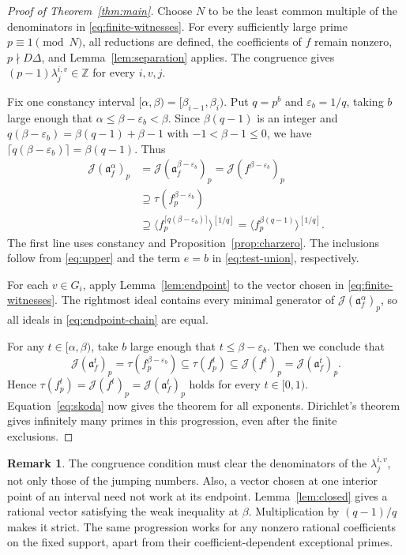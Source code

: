 \documentclass[11pt]{amsart}
\numberwithin{equation}{section}
\theoremstyle{definition}
\newtheorem{remark}[theorem]{Remark}
\newcommand{\J}{\mathcal J}
\newcommand{\aideal}{\mathfrak a}
\newcommand{\Z}{\mathbb Z}
\begin{document}
\begin{proof}[Proof of Theorem~\ref{thm:main}]
Choose $N$ to be the least common multiple of the denominators in
\eqref{eq:finite-witnesses}. For every sufficiently large prime
$p\equiv1\pmod N$, all reductions are defined, the coefficients of $f$
remain nonzero, $p\nmid D\Delta$, and Lemma~\ref{lem:separation} applies. The congruence
gives $(p-1)\lambda_j^{i,v}\in\Z$ for every $i,v,j$.

Fix one constancy interval $[\alpha,\beta)=[\beta_{i-1},\beta_i)$.
Put $q=p^b$ and $\varepsilon_b=1/q$, taking $b$ large enough that
$\alpha\le \beta -\varepsilon_b <\beta$. Since $\beta(q-1)$ is an integer and
$q(\beta -\varepsilon_b)=\beta(q-1)+\beta-1$ with $-1<\beta-1\le0$, we have
$\lceil q (\beta -\varepsilon_b)\rceil=\beta(q-1)$. Thus
\begin{equation}\label{eq:endpoint-chain}
\begin{aligned}
 \J(\aideal_f^\alpha)_p
 &=\J(\aideal_f^{\beta -\varepsilon_b})_p=\J(f^{\beta -\varepsilon_b})_p\\
 &\supseteq\tau(f_p^{\beta -\varepsilon_b})\\
 &\supseteq\langle f_p^{\lceil q(\beta -\varepsilon_b)\rceil}\rangle^{[1/q]}
 =\langle f_p^{\beta(q-1)}\rangle^{[1/q]}.
\end{aligned}
\end{equation}
The first line uses constancy and Proposition~\ref{prop:charzero}.
The inclusions follow from \eqref{eq:upper} and the term $e=b$ in
\eqref{eq:test-union}, respectively.

For each $v\in G_i$, apply Lemma~\ref{lem:endpoint} to the vector
chosen in \eqref{eq:finite-witnesses}. The rightmost ideal contains
every minimal generator of $\J(\aideal_f^\alpha)_p$, so all ideals
in \eqref{eq:endpoint-chain} are equal.

For any $t\in[\alpha,\beta)$, take $b$ large enough that $t\le \beta -\varepsilon_b$.
Then we conclude that 
\[
 \J(\aideal_f^t)_p=\tau(f_p^{\beta -\varepsilon_b})
 \subseteq\tau(f_p^t)\subseteq \J(f^t)_p=\J(\aideal_f^t)_p.
\]
Hence $\tau(f_p^t)=\J(f^t)_p=\J(\aideal_f^t)_p$
holds for every $t\in[0,1)$.
Equation~\eqref{eq:skoda} now gives the theorem for all exponents.
Dirichlet's theorem \cite{Dav} gives infinitely many primes in this
progression, even after the finite exclusions.
\end{proof}

\begin{remark}
The congruence condition must clear the denominators of the
$\lambda_j^{i,v}$, not only those of the jumping numbers.
Also, a vector chosen at one interior point of an interval need not work
at its endpoint. Lemma~\ref{lem:closed} gives a rational vector satisfying
the weak inequality at $\beta$. Multiplication by $(q-1)/q$ makes it strict.
The same progression works for any nonzero rational coefficients on the
fixed support, apart from their coefficient-dependent exceptional primes.
\end{remark}
\end{document}
